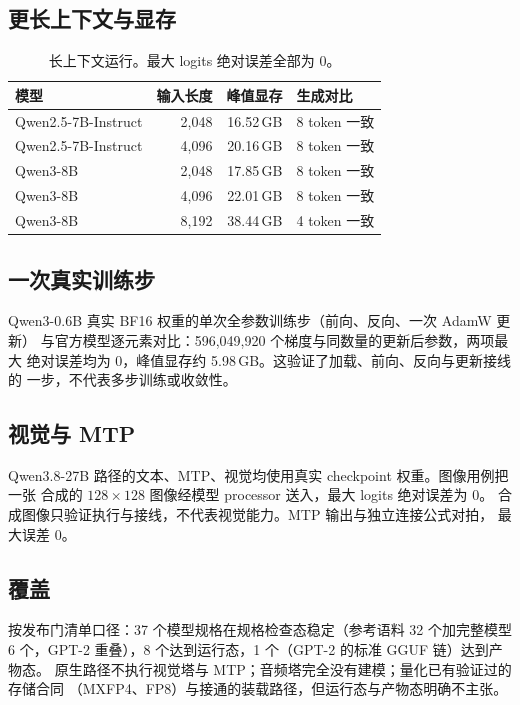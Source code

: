 \documentclass[11pt,a4paper]{ctexart}
\begin{document}
\subsection{更长上下文与显存}

\begin{table}[t]
\centering\small
\caption{长上下文运行。最大 logits 绝对误差全部为 0。}
\label{tab:longctx}
\begin{tabular}{@{}lrrl@{}}
\toprule
模型 & 输入长度 & 峰值显存 & 生成对比 \\
\midrule
Qwen2.5-7B-Instruct & 2{,}048 & 16.52\,GB & 8 token 一致 \\
Qwen2.5-7B-Instruct & 4{,}096 & 20.16\,GB & 8 token 一致 \\
Qwen3-8B & 2{,}048 & 17.85\,GB & 8 token 一致 \\
Qwen3-8B & 4{,}096 & 22.01\,GB & 8 token 一致 \\
Qwen3-8B & 8{,}192 & 38.44\,GB & 4 token 一致 \\
\bottomrule
\end{tabular}
\end{table}

\subsection{一次真实训练步}

Qwen3-0.6B 真实 BF16 权重的单次全参数训练步（前向、反向、一次 AdamW 更新）
与官方模型逐元素对比：596{,}049{,}920 个梯度与同数量的更新后参数，两项最大
绝对误差均为 0，峰值显存约 5.98\,GB。这验证了加载、前向、反向与更新接线的
一步，不代表多步训练或收敛性。

\subsection{视觉与 MTP}

Qwen3.8-27B 路径的文本、MTP、视觉均使用真实 checkpoint 权重。图像用例把一张
合成的 $128\times128$ 图像经模型 processor 送入，最大 logits 绝对误差为 0。
合成图像只验证执行与接线，不代表视觉能力。MTP 输出与独立连接公式对拍，
最大误差 0。

\subsection{覆盖}

按发布门清单口径：37 个模型规格在规格检查态稳定（参考语料 32 个加完整模型
6 个，GPT-2 重叠），8 个达到运行态，1 个（GPT-2 的标准 GGUF 链）达到产物态。
原生路径不执行视觉塔与 MTP；音频塔完全没有建模；量化已有验证过的存储合同
（MXFP4、FP8）与接通的装载路径，但运行态与产物态明确不主张。
\end{document}
